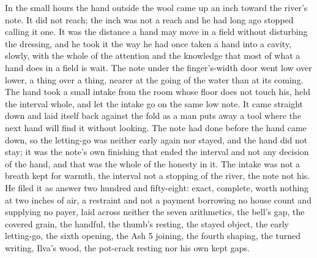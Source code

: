 In the small hours the hand outside the wool came up an inch toward the river's note. It did not reach; the inch was not a reach and he had long ago stopped calling it one. It was the distance a hand may move in a field without disturbing the dressing, and he took it the way he had once taken a hand into a cavity, slowly, with the whole of the attention and the knowledge that most of what a hand does in a field is wait. The note under the finger's-width door went low over lower, a thing over a thing, nearer at the going of the water than at its coming. The hand took a small intake from the room whose floor does not touch his, held the interval whole, and let the intake go on the same low note. It came straight down and laid itself back against the fold as a man puts away a tool where the next hand will find it without looking. The note had done before the hand came down, so the letting-go was neither early again nor stayed, and the hand did not stay; it was the note's own finishing that ended the interval and not any decision of the hand, and that was the whole of the honesty in it. The intake was not a breath kept for warmth, the interval not a stopping of the river, the note not his. He filed it as answer two hundred and fifty-eight: exact, complete, worth nothing at two inches of air, a restraint and not a payment borrowing no house count and supplying no payer, laid across neither the seven arithmetics, the bell's gap, the covered grain, the handful, the thumb's resting, the stayed object, the early letting-go, the sixth opening, the Ash 5 joining, the fourth shaping, the turned writing, Ilva's wood, the pot-crack resting nor his own kept gaps.

